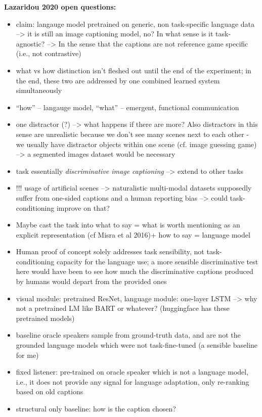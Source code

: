 \documentclass[11pt,letterpaper]{article}
\begin{document}
\textbf{Lazaridou 2020 open questions: }
\begin{itemize}
	\item claim: langauge model pretrained on generic, non task-specific language data --> it is still an image captioning model, no? In what sense is it task-agnostic? --> In the sense that the captions are not reference game specific (i.e., not contrastive)
	\item what vs how distinction isn't fleshed out until the end of the experiment; in the end, these two are addressed by one combined learned system simultaneously
	\item ``how'' -- langauge model, ``what'' -- emergent, functional communication
	\item one distractor (?) --> what happens if there are more? Also distractors in this sense are unrealistic because we don't see many scenes next to each other - we usually have distractor objects within one scene (cf. image guessing game) --> a segmented images dataset would be necessary
	\item task essentially \textit{discriminative image captioning} --> extend to other tasks
	\item !!! usage of artificial scenes --> naturalistic multi-modal datasets supposedly suffer from one-sided captions and a human reporting bias --> could task-conditioning improve on that?
	\item Maybe cast the task into what to say = what is worth mentioning as an explicit representation (cf Misra et al 2016)+ how to say = language model
	\item Human proof of concept solely addresses task sensibility, not task-conditioning capacity for the language use; a more sensible discriminative test here would have been to see how much the discriminative captions produced by humans would depart from the provided ones
	\item visual module: pretrained ResNet, language module: one-layer LSTM --> why not a pretrained LM like BART or whatever? (huggingface has these pretrained models)
	\item baseline oracle speakers sample from ground-truth data, and are not the grounded language models which were not task-fine-tuned (a sensible baseline for me)
	\item fixed listener: pre-trained on oracle speaker which is not a language model, i.e., it does not provide any signal for language adaptation, only re-ranking based on old captions
	\item structural only baseline: how is the caption chosen?

\end{itemize}
\end{document}
